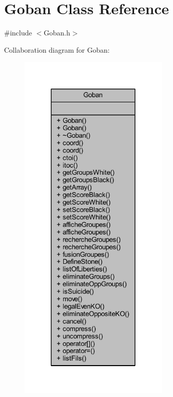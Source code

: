 \hypertarget{class_goban}{}\section{Goban Class Reference}
\label{class_goban}


{\ttfamily \#include $<$Goban.\+h$>$}



Collaboration diagram for Goban\+:
\nopagebreak
\begin{figure}[H]
\begin{center}
\leavevmode
\includegraphics[width=204pt]{class_goban__coll__graph}
\end{center}
\end{figure}
